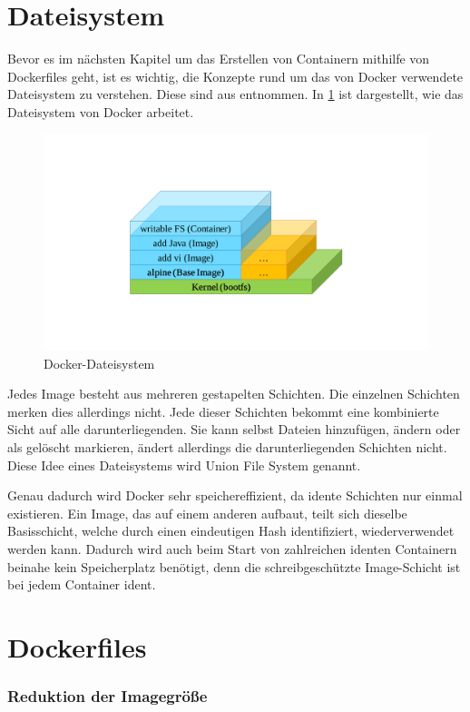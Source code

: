 \section{Dateisystem}
\label{sec:dateisystem}
Bevor es im nächsten Kapitel um das Erstellen von Containern mithilfe von Dockerfiles geht, ist es wichtig, die Konzepte rund um das von Docker verwendete Dateisystem zu verstehen.
Diese sind aus \autocite{docker-filesystem:online} entnommen.
In \cref{fig:docker-dateisystem} ist dargestellt, wie das Dateisystem von Docker arbeitet.
\begin{figure}[htbp]
    \centering
    \includegraphics[width=0.7\linewidth,clip,trim=130 130 130 110]{images/docker-filesystem}
    \caption{Docker-Dateisystem}
\label{fig:docker-dateisystem}
\end{figure}
Jedes Image besteht aus mehreren gestapelten Schichten.
Die einzelnen Schichten merken dies allerdings nicht.
Jede dieser Schichten bekommt eine kombinierte Sicht auf alle darunterliegenden.
Sie kann selbst Dateien hinzufügen, ändern oder als gelöscht markieren, ändert allerdings die darunterliegenden Schichten nicht.
Diese Idee eines Dateisystems wird Union File System genannt.

Genau dadurch wird Docker sehr speichereffizient, da idente Schichten nur einmal existieren.
Ein Image, das auf einem anderen aufbaut, teilt sich dieselbe Basisschicht, welche durch einen eindeutigen Hash identifiziert, wiederverwendet werden kann.
Dadurch wird auch beim Start von zahlreichen identen Containern beinahe kein Speicherplatz benötigt, denn die schreibgeschützte Image-Schicht ist bei jedem Container ident.


\section{Dockerfiles}
\label{sec:dockerfiles}
\subsubsection{Reduktion der Imagegröße}
